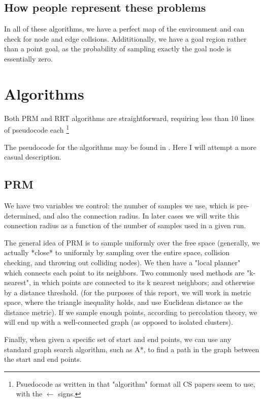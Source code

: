 \documentclass[a4paper]{article}
\begin{document}
\subsection{How people represent these problems}

In all of these algorithms, we have a perfect map of the environment and can
check for node and edge collsions. Addititionally, we have a goal region rather
than a point goal, as the probability of sampling exactly the goal node is
essentially zero.

\section{Algorithms}

Both PRM and RRT algorithms are straightforward, requiring less than 10
lines of pseudocode each \footnote{Psuedocode as written in that "algorithm"
format all CS papers seem to use, with the $\gets$ signs.} 

The pseudocode for the algorithms may be found in \cite{RRT*}. Here I will
attempt a more casual description. 


\subsection{PRM}

We have two variables we control: the number of samples we use, which is
pre-determined, and also the connection radius. In later cases we will write
this connection radius as a function of the number of samples used in a
given run. 

The general idea of PRM is to sample uniformly over the free space (generally,
we actually *close* to uniformly by sampling over the entire space, collision
checking, and throwing out colliding nodes). We then have a "local planner"
which connects each point to its neighbors. Two commonly used methods are
"k-nearest", in which points are connected to its k nearest neighbors; and
otherwise by a distance threshold. (for the purposes of this report, we will
work in metric space, where the triangle inequality holds, and use Euclidean
distance as the distance metric). If we sample enough points, according to percolation
theory, we will end up with a well-connected graph (as opposed to isolated
clusters).

Finally, when given a specific set of start and end points, we can use any
standard graph search algorithm, such as A*, to find a path in the graph between
the start and end points.
\end{document}
